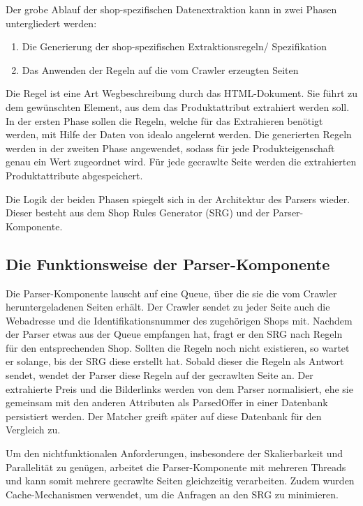 Der grobe Ablauf der shop-spezifischen Datenextraktion kann in zwei Phasen untergliedert werden:
\begin{enumerate}
    \item Die Generierung der shop-spezifischen Extraktionsregeln/ Spezifikation
    \item Das Anwenden der Regeln auf die vom Crawler erzeugten Seiten
\end{enumerate}
Die Regel ist eine Art Wegbeschreibung durch das HTML-Dokument.
Sie führt zu dem gewünschten Element, aus dem das Produktattribut extrahiert werden soll.
In der ersten Phase sollen die Regeln, welche für das Extrahieren benötigt werden, mit Hilfe der Daten von idealo
angelernt werden.
Die generierten Regeln werden in der zweiten Phase angewendet, sodass für jede Produkteigenschaft genau ein Wert
zugeordnet wird.
Für jede gecrawlte Seite werden die extrahierten Produktattribute abgespeichert.

Die Logik der beiden Phasen spiegelt sich in der Architektur des Parsers wieder.
Dieser besteht aus dem Shop Rules Generator (SRG) und der Parser-Komponente.

\subsection{Die Funktionsweise der Parser-Komponente}
\label{subsec:funktionsweise-parser}

Die Parser-Komponente lauscht auf eine Queue, über die sie die vom Crawler heruntergeladenen Seiten erhält.
Der Crawler sendet zu jeder Seite auch die Webadresse und die Identifikationsnummer des zugehörigen Shops mit.
Nachdem der Parser etwas aus der Queue empfangen hat, fragt er den SRG nach Regeln für den entsprechenden Shop.
Sollten die Regeln noch nicht existieren, so wartet er solange, bis der SRG diese erstellt hat.
Sobald dieser die Regeln als Antwort sendet, wendet der Parser diese Regeln auf der gecrawlten Seite an.
Der extrahierte Preis und die Bilderlinks werden von dem Parser normalisiert, ehe sie gemeinsam mit den anderen
Attributen als ParsedOffer in einer Datenbank persistiert werden.
Der Matcher greift später auf diese Datenbank für den Vergleich zu.

Um den nichtfunktionalen Anforderungen, insbesondere der Skalierbarkeit und Parallelität zu genügen, arbeitet die
Parser-Komponente mit mehreren Threads und kann somit mehrere gecrawlte Seiten gleichzeitig verarbeiten.
Zudem wurden Cache-Mechanismen verwendet, um die Anfragen an den SRG zu minimieren.


